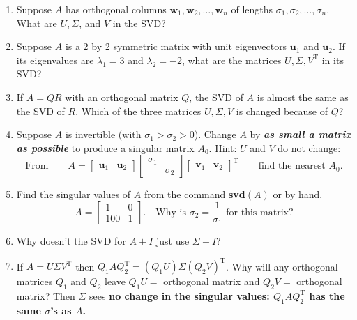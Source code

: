 \documentclass[14pt, a4paper]{article}
\begin{document}
\begin{enumerate}
    \item Suppose $A$ has orthogonal columns $\boldsymbol{w}_1, \boldsymbol{w}_2, \dots, \boldsymbol{w}_n$ of lengths $\sigma_1, \sigma_2, \dots, \sigma_n$. What are $U, \Sigma$, and $V$ in the SVD?

    \item Suppose $A$ is a 2 by 2 symmetric matrix with unit eigenvectors $\boldsymbol{u}_1$ and $\boldsymbol{u}_2$. If its eigenvalues are $\lambda_1 = 3$ and $\lambda_2 = -2$, what are the matrices $U, \Sigma, V^{\mathrm{T}}$ in its SVD?

    \item If $A = QR$ with an orthogonal matrix $Q$, the SVD of $A$ is almost the same as the SVD of $R$. Which of the three matrices $U, \Sigma, V$ is changed because of $Q$?

    \item Suppose $A$ is invertible (with $\sigma_1 > \sigma_2 > 0$). Change $A$ by \textbf{\textit{as small a matrix as possible}} to produce a singular matrix $A_0$. Hint: $U$ and $V$ do not change:
          \[
              \text{From} \qquad A = \begin{bmatrix} \boldsymbol{u}_1 & \boldsymbol{u}_2 \end{bmatrix} \begin{bmatrix} \sigma_1 & \\ & \sigma_2 \end{bmatrix} \begin{bmatrix} \boldsymbol{v}_1 & \boldsymbol{v}_2 \end{bmatrix}^{\mathrm{T}} \qquad \text{find the nearest } A_0.
          \]

    \item Find the singular values of $A$ from the command \textbf{svd}$(A)$ or by hand.
          \[
              A = \begin{bmatrix} 1 & 0 \\ 100 & 1 \end{bmatrix}. \quad \text{Why is } \sigma_2 = \frac{1}{\sigma_1} \text{ for this matrix?}
          \]

    \item Why doesn't the SVD for $A + I$ just use $\Sigma + I$?

    \item If $A = U\Sigma V^{\mathrm{T}}$ then $Q_1 A Q_2^{\mathrm{T}} = (Q_1 U)\Sigma(Q_2 V)^{\mathrm{T}}$. Why will any orthogonal matrices $Q_1$ and $Q_2$ leave $Q_1 U =$ orthogonal matrix and $Q_2 V =$ orthogonal matrix? Then $\Sigma$ sees \textbf{no change in the singular values: $Q_1 A Q_2^{\mathrm{T}}$ has the same $\sigma$'s as $A$.}


\end{enumerate}
\end{document}

